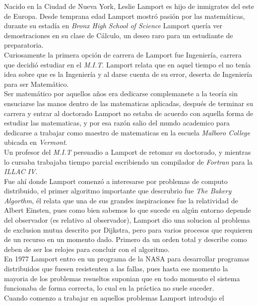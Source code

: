 \documentclass{article}
\begin{document}
\begin{enumerate}
{      Nacido en la Ciudad de Nueva York, Leslie Lamport es hijo de
      inmigrates del este de Europa. Desde temprana edad Lamport mostró pasión
      por las matemáticas, durante su estadía en \textit{Bronx High School of 
        Science} Lamport quería ver demostraciones en su clase de Cálculo, un 
      deseo raro para un estudiante de preparatoria.\\
      Curiosamente la primera opción de carrera de Lamport fue Ingeniería, 
      carrera que decidió estudiar en el \textit{M.I.T}. Lamport relata que en
      aquel tiempo el no tenía idea sobre que es la Ingeniería y al darse cuenta
      de su error, deserta de Ingeniería para ser Matemático.\\
      Ser matemático por aquellos años era dedicarse complemanete a la teoría
      sin ensuciarse las manos dentro de las matematicas aplicadas, después de
      terminar su carrera y entrar al doctorado Lamport no estaba de acuerdo 
      con aquella forma de estudiar las matematicas, y por esa razón salio del
      mundo academico para dedicarse a trabajar como maestro de matematicas en 
      la escuela \textit{Malboro College} ubicada en \textit{Vermont}.\\
      Un profesor del \textit{M.I.T} persuadio a Lamport de retomar su
      doctorado, y mientras lo cursaba trabajaba tiempo parcial escribiendo
      un compilador de \textit{Fortran} para la \textit{ILLAC IV}.\\
      Fue ahí donde Lamport comenzó a interesarse por problemas de computo 
      distribuido, el primer algoritmo importante que descrubrio fue \textit{
        The Bakery Algorthm}, él relata que una de sus grandes inspiraciones 
      fue la relatividad de Albert Einsten, pues como bien sabemos lo que sucede
      en algún entorno depende del observador (es relativo al observador), 
      Lamport dio una solucion al problema de exclusion mutua descrito por 
      Dijkstra, pero para varios procesos que requieren de un recurso en un 
      momento dado. Primero da un orden total y describe como deben de ser los
      relojes para concluir con el algoritmo.\\
      En 1977 Lamport entro en un programa de la NASA para desarrollar programas
      distribuidos que fuesen resistenten a las fallas, pues hasta ese momento 
      la mayoria de los problemas resueltos suponian que en todo momento el 
      sistema funcionaba de forma correcta, lo cual en la práctica no suele
      suceder.\\
      Cuando comenzo a trabajar en aquellos problemas Lamport introdujo el
}
\end{enumerate}
\end{document}
